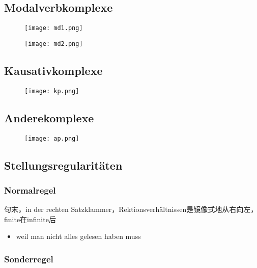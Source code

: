 \documentclass[UTF8]{report}
\begin{document}
\subsection{Modalverbkomplexe}
\begin{figure}[H]
    \centering
    \texttt{[image: md1.png]}
\end{figure}
\begin{figure}[H]
    \centering
    \texttt{[image: md2.png]}
\end{figure}

\subsection{Kausativkomplexe}
\begin{figure}[H]
    \centering
    \texttt{[image: kp.png]}
\end{figure}


\subsection{Anderekomplexe}
\begin{figure}[H]
    \centering
    \texttt{[image: ap.png]}
\end{figure}


\subsection{Stellungsregularitäten}

\subsubsection{Normalregel}
句末，in der rechten Satzklammer，Rektionsverhältnissen是镜像式地从右向左，finite在infinite后
\begin{itemize}
    \item weil man nicht alles gelesen haben muss
\end{itemize}
\subsubsection{Sonderregel}
\end{document}
